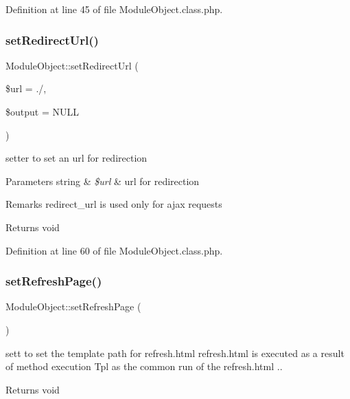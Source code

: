 Definition at line 45 of file Module\+Object.\+class.\+php.

\hypertarget{classModuleObject_a6e3aac0a3457fe14845216d15dba98ec}{}\label{classModuleObject_a6e3aac0a3457fe14845216d15dba98ec} 
\subsubsection{\texorpdfstring{set\+Redirect\+Url()}{setRedirectUrl()}}
{\footnotesize\ttfamily Module\+Object\+::set\+Redirect\+Url (\begin{DoxyParamCaption}\item[{}]{\$url = {\ttfamily \textquotesingle{}./\textquotesingle{}},  }\item[{}]{\$output = {\ttfamily NULL} }\end{DoxyParamCaption})}

setter to set an url for redirection 
\begin{DoxyParams}[1]{Parameters}
string & {\em \$url} & url for redirection \\
\hline
\end{DoxyParams}
\begin{DoxyRemark}{Remarks}
redirect\+\_\+url is used only for ajax requests 
\end{DoxyRemark}
\begin{DoxyReturn}{Returns}
void 
\end{DoxyReturn}


Definition at line 60 of file Module\+Object.\+class.\+php.

\hypertarget{classModuleObject_a6d0d3436c8c64591e1a3534647714969}{}\label{classModuleObject_a6d0d3436c8c64591e1a3534647714969} 
\subsubsection{\texorpdfstring{set\+Refresh\+Page()}{setRefreshPage()}}
{\footnotesize\ttfamily Module\+Object\+::set\+Refresh\+Page (\begin{DoxyParamCaption}{ }\end{DoxyParamCaption})}

sett to set the template path for refresh.\+html refresh.\+html is executed as a result of method execution Tpl as the common run of the refresh.\+html .. \begin{DoxyReturn}{Returns}
void 
\end{DoxyReturn}


